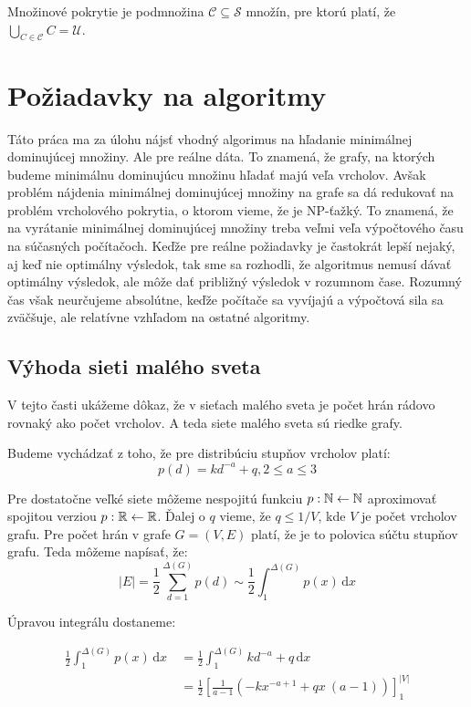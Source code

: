 Množinové pokrytie je podmnožina $\mathcal{C} \subseteq \mathcal{S}$ množín, 
pre ktorú platí, že $\bigcup_{C \in \mathcal{C}} C = \mathcal{U}$.

\section{Požiadavky na algoritmy}

Táto práca ma za úlohu nájsť vhodný algorimus na hľadanie minimálnej 
dominujúcej množiny. Ale pre reálne dáta. To znamená, že grafy, na ktorých 
budeme minimálnu dominujúcu množinu hľadať majú veľa vrcholov. Avšak problém 
nájdenia minimálnej dominujúcej množiny na grafe sa dá redukovať na problém 
vrcholového pokrytia, o ktorom vieme, že je NP-ťažký. To znamená, že na 
vyrátanie minimálnej dominujúcej množiny treba veľmi veľa výpočtového času na 
súčasných počítačoch. Keďže pre reálne požiadavky je častokrát lepší nejaký, 
aj keď nie optimálny výsledok, tak sme sa rozhodli, že algoritmus nemusí dávať 
optimálny výsledok, ale môže dať približný výsledok v rozumnom čase. Rozumný 
čas však neurčujeme absolútne, keďže počítače sa vyvíjajú a výpočtová sila sa 
zväčšuje, ale relatívne vzhľadom na ostatné algoritmy.

\subsection{Výhoda sieti malého sveta}

V tejto časti ukážeme dôkaz, že v sieťach malého sveta je počet hrán rádovo 
rovnaký ako počet vrcholov. A teda siete malého sveta sú riedke grafy. 

Budeme vychádzať z toho, že pre distribúciu stupňov vrcholov platí:
$$p(d) = kd^{-a} + q, 2 \leq a \leq 3$$

Pre dostatočne veľké siete môžeme nespojitú funkciu $p : \mathbb{N} \leftarrow \mathbb{N}$ 
aproximovať spojitou verziou $p : \mathbb{R} \leftarrow \mathbb{R}$. Ďalej o $q$ vieme, že 
$q \leq 1/V$, kde $V$ je počet vrcholov grafu. Pre počet hrán v grafe 
$G = (V, E)$ platí, že je to polovica súčtu stupňov grafu. Teda môžeme napísať, 
že: $$|E| = \frac{1}{2}\sum_{d = 1}^{\Delta(G)} p(d) \sim 
\frac{1}{2}\int_1^{\Delta (G)} \! p(x) \, \mathrm{d}x$$

Úpravou integrálu dostaneme:

\begin{align*}
\frac{1}{2}\int_1^{\Delta (G)} \! p(x) \, \mathrm{d}x \
&= \frac{1}{2}\int_1^{\Delta (G)} \! kd^{-a} + q \, \mathrm{d}x \\
&= \frac{1}{2}\left[\frac{1}{a - 1} \left(- k x^{- a + 1} + q x \
\left(a - 1\right)\right)\right]_1^{|V|}
\end{align*}

